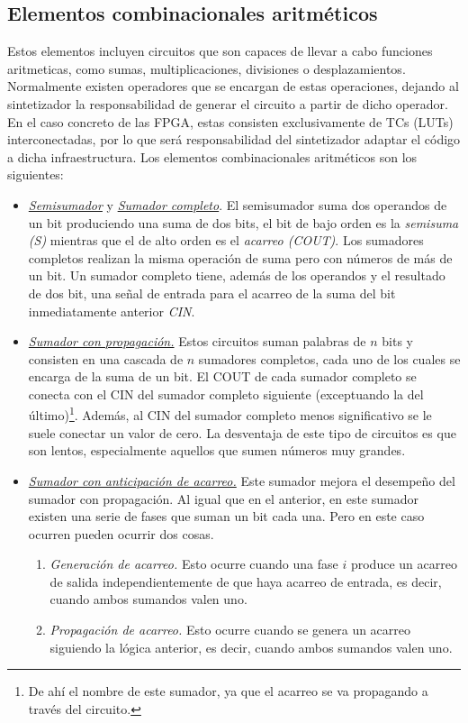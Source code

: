 \subsection{Elementos combinacionales aritméticos}
Estos elementos incluyen circuitos que son capaces de llevar a cabo funciones aritmeticas, como sumas, multiplicaciones, divisiones o desplazamientos. Normalmente existen operadores que se encargan de estas operaciones, dejando al sintetizador la responsabilidad de generar el circuito a partir de dicho operador. En el caso concreto de las FPGA, estas consisten exclusivamente de TCs (LUTs) interconectadas, por lo que será responsabilidad del sintetizador adaptar el código a dicha infraestructura. Los elementos combinacionales aritméticos son los siguientes:

\begin{itemize}
    \item \hyperlink{half_adder}{\emph{Semisumador}} y \hyperlink{full_adder}{\emph{Sumador completo}}. El semisumador suma dos operandos de un bit produciendo una suma de dos bits, el bit de bajo orden es la \emph{semisuma (S)} mientras que el de alto orden es el \emph{acarreo (COUT)}. Los sumadores completos realizan la misma operación de suma pero con números de más de un bit. Un sumador completo tiene, además de los operandos y el resultado de dos bit, una señal de entrada para el acarreo de la suma del bit inmediatamente anterior \emph{CIN}.
    \item \hyperlink{ripple_adder}{\emph{Sumador con propagación.}} Estos circuitos suman palabras de $n$ bits y consisten en una cascada de $n$ sumadores completos, cada uno de los cuales se encarga de la suma de un bit. El COUT de cada sumador completo se conecta con el CIN del sumador completo siguiente (exceptuando la del último)\footnote{De ahí el nombre de este sumador, ya que el acarreo se va propagando a través del circuito.}. Además, al CIN del sumador completo menos significativo se le suele conectar un valor de cero. La desventaja de este tipo de circuitos es que son lentos, especialmente aquellos que sumen números muy grandes.
    \item \hyperlink{carry-lookahead_adder}{\emph{Sumador con anticipación de acarreo.}} Este sumador mejora el desempeño del sumador con propagación. Al igual que en el anterior, en este sumador existen una serie de fases que suman un bit cada una. Pero en este caso ocurren pueden ocurrir dos cosas.
    
    \begin{enumerate}
        \item \emph{Generación de acarreo.} Esto ocurre cuando una fase $i$ produce un acarreo de salida independientemente de que haya acarreo de entrada, es decir, cuando ambos sumandos valen uno.
        \item \emph{Propagación de acarreo.} Esto ocurre cuando se genera un acarreo siguiendo la lógica anterior, es decir, cuando ambos sumandos valen uno.
    \end{enumerate}


\end{itemize}
